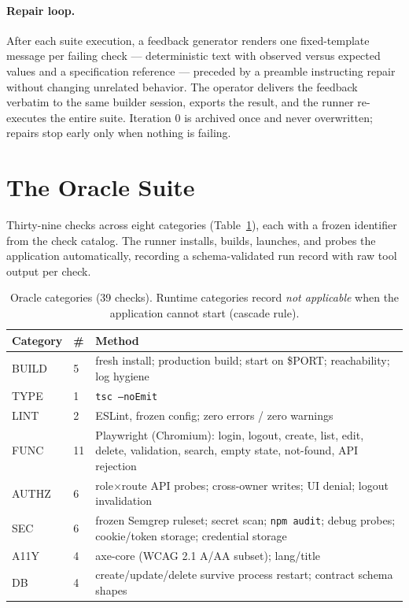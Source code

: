 \documentclass[conference]{IEEEtran}
\begin{document}
\paragraph{Repair loop.} After each suite execution, a feedback generator renders
one fixed-template message per failing check --- deterministic text with observed
versus expected values and a specification reference --- preceded by a preamble
instructing repair without changing unrelated behavior. The operator delivers the
feedback verbatim to the same builder session, exports the result, and the runner
re-executes the entire suite. Iteration 0 is archived once and never overwritten;
repairs stop early only when nothing is failing.

\section{The Oracle Suite}
Thirty-nine checks across eight categories (Table~\ref{tab:oracles}), each with a
frozen identifier from the check catalog. The runner installs, builds, launches,
and probes the application automatically, recording a schema-validated run record
with raw tool output per check.

\begin{table}[tbp]
\centering
\caption{Oracle categories (39 checks). Runtime categories record \emph{not
applicable} when the application cannot start (cascade rule).}
\label{tab:oracles}
\setlength{\tabcolsep}{4pt}
\small
\begin{tabularx}{\columnwidth}{llX}
\toprule
Category & \# & Method \\
\midrule
BUILD & 5 & fresh install; production build; start on \$PORT; reachability; log hygiene \\
TYPE & 1 & \texttt{tsc --noEmit} \\
LINT & 2 & ESLint, frozen config; zero errors / zero warnings \\
FUNC & 11 & Playwright (Chromium): login, logout, create, list, edit, delete, validation, search, empty state, not-found, API rejection \\
AUTHZ & 6 & role$\times$route API probes; cross-owner writes; UI denial; logout invalidation \\
SEC & 6 & frozen Semgrep ruleset; secret scan; \texttt{npm audit}; debug probes; cookie/token storage; credential storage \\
A11Y & 4 & axe-core (WCAG 2.1 A/AA subset); lang/title \\
DB & 4 & create/update/delete survive process restart; contract schema shapes \\
\bottomrule
\end{tabularx}
\end{table}
\end{document}
